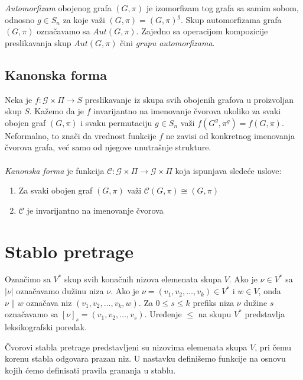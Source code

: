 \documentclass[12pt,oneside]{memoir}
\theoremstyle{definition} \newtheorem*{definition}{Definicija}
\begin{document}
  \emph{Automorfizam} obojenog grafa $(G, \pi)$ je izomorfizam tog grafa sa
  samim sobom, odnosno $g \in S_n$ za koje važi $(G, \pi) = (G, \pi)^g$. Skup
  automorfizama grafa $(G, \pi)$ označavamo sa $Aut(G, \pi)$. Zajedno sa
  operacijom kompozicije preslikavanja skup $Aut(G, \pi)$ čini \emph{grupu
  automorfizama}.


  \subsection{Kanonska forma}

  Neka je $f : \mathcal{G} \times \Pi \to S$ preslikavanje iz skupa svih
  obojenih grafova u proizvoljan skup $S$.  Kažemo da je $f$ invarijantno na
  imenovanje čvorova ukoliko za svaki obojen graf $(G, \pi)$ i svaku
  permutaciju $g \in S_n$ važi $f(G^g, \pi^g) = f(G, \pi)$. Neformalno, to
  znači da vrednost funkcije $f$ ne zavisi od konkretnog imenovanja čvorova
  grafa, već samo od njegove unutrašnje strukture. \\
  \\
  \emph{Kanonska forma} je funkcija $\mathcal{C} : \mathcal{G} \times \Pi \to
  \mathcal{G} \times \Pi$ koja ispunjava sledeće uslove:
  \begin{enumerate}
   \item Za svaki obojen graf $(G, \pi)$ važi $\mathcal{C}(G, \pi) \cong (G,
	   \pi)$
   \item $\mathcal{C}$ je invarijantno na imenovanje čvorova
  \end{enumerate}


 \section{Stablo pretrage}

 Označimo sa $V^*$ skup svih konačnih nizova elemenata skupa $V$. Ako je $\nu
 \in V^*$ sa $|\nu|$ označavamo dužinu niza $\nu$. Ako je $\nu = (v_1, v_2,
 \dots, v_k) \in V^*$ i $w \in V$, onda $\nu \| w$ označava niz $(v_1, v_2,
 \dots, v_k, w)$. Za $0 \leq s \leq k$ prefiks niza $\nu$ dužine $s$ označavamo
 sa $[\nu]_s = (v_1, v_2, \dots, v_s)$. Uređenje $\leq$ na skupu $V^*$
 predstavlja leksikografski poredak.

 Čvorovi stabla pretrage  predstavljeni su nizovima elemenata skupa $V$, pri
 čemu korenu stabla odgovara prazan niz. U nastavku definišemo funkcije na
 osnovu kojih ćemo definisati pravila grananja u stablu.
\end{document}

